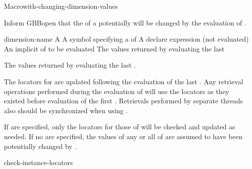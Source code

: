 \documentclass[10pt,twoside,english,pdftex]{article}
\begin{document}

\begin{functiondoc}{Macro}{with-changing-dimension-values}%
  {
    }
%
  
\fnsyntax

\fnpurpose Inform GBBopen that the  of a
 potentially will be changed by the evaluation of
.

\fnpackage {}

\fnmodule {}

\fnargs
\begin{args}{dimension-name}
 A 
 A symbol specifying a  of
\arg[declaration] A declare expression (not evaluated)
\arg[forms] An implicit  of  to be evaluated
\arg[results] The values returned by evaluating the last 
\end{args}

\fnreturns The values returned by evaluating the last .

\fndescription
%
The locators for  are updated following the evaluation of
the last .  Any retrieval operations performed during the evaluation
of  will use the  locators as they
existed before evaluation of the first .  Retrievals performed by
separate threads also should be synchronized when using
.

If  are specified, only the locators for those
 of  will be checked and updated as
needed. If no  are specified, the values of any
or all  of  are assumed to have
been potentially changed by .

\begin{alsos}{check-instance-locators}
\end{alsos}


\end{functiondoc}
\end{document}
